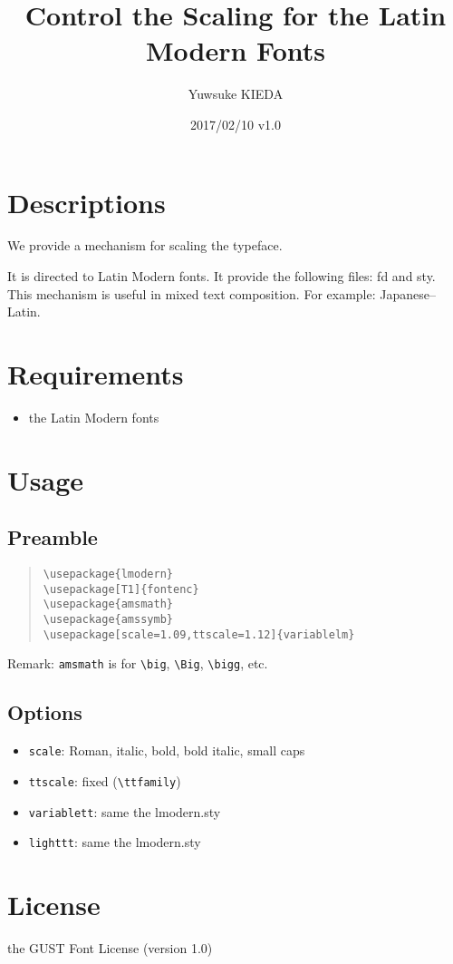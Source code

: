 \documentclass{article}
\title{Control the Scaling for the Latin Modern Fonts}
\author{Yuwsuke KIEDA}
\date{2017/02/10 v1.0}
\begin{document}
\maketitle

\section{Descriptions}

We provide a mechanism for scaling the typeface.

It is directed to Latin Modern fonts.
It provide the following files: fd and sty.
This mechanism is useful in mixed text composition.
For example: Japanese--Latin.

\section{Requirements}

\begin{itemize}
 \item the Latin Modern fonts
\end{itemize}

\section{Usage}

\subsection{Preamble}

\begin{quote}
\begin{verbatim}
\usepackage{lmodern}
\usepackage[T1]{fontenc}
\usepackage{amsmath}
\usepackage{amssymb}
\usepackage[scale=1.09,ttscale=1.12]{variablelm}
\end{verbatim}
\end{quote}

Remark: \texttt{amsmath} is for \verb!\big!, \verb!\Big!, \verb!\bigg!, etc.

\subsection{Options}

\begin{itemize}
 \item [\textendash] \texttt{scale}: Roman, italic, bold, bold italic, small caps
 \item [\textendash] \texttt{ttscale}: fixed (\verb!\ttfamily!)
 \item [\textendash] \texttt{variablett}: same the lmodern.sty
 \item [\textendash] \texttt{lighttt}: same the lmodern.sty
\end{itemize}


\section{License}

the GUST Font License (version 1.0)
\end{document}
